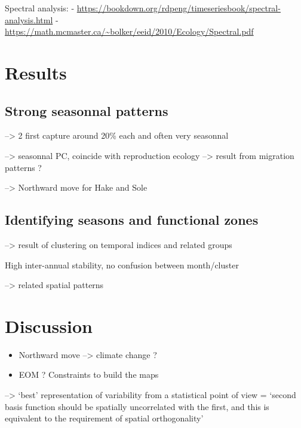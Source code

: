 \documentclass[
  man]{apa6}
\begin{document}
Spectral analysis: - \url{https://bookdown.org/rdpeng/timeseriesbook/spectral-analysis.html} - \url{https://math.mcmaster.ca/~bolker/eeid/2010/Ecology/Spectral.pdf}

\hypertarget{results}{%
\section{Results}\label{results}}

\hypertarget{strong-seasonnal-patterns}{%
\subsection{Strong seasonnal patterns}\label{strong-seasonnal-patterns}}

--\textgreater{} 2 first capture around 20\% each and often very seasonnal

--\textgreater{} seasonnal PC, coincide with reproduction ecology --\textgreater{} result from migration patterns ?

--\textgreater{} Northward move for Hake and Sole

\hypertarget{identifying-seasons-and-functional-zones}{%
\subsection{Identifying seasons and functional zones}\label{identifying-seasons-and-functional-zones}}

--\textgreater{} result of clustering on temporal indices and related groups

High inter-annual stability, no confusion between month/cluster

--\textgreater{} related spatial patterns

\hypertarget{discussion}{%
\section{Discussion}\label{discussion}}

\begin{itemize}
\item
  Northward move --\textgreater{} climate change ?
\item
  EOM ? Constraints to build the maps
\end{itemize}

--\textgreater{} `best' representation of variability from a statistical point of view = `second basis function should be spatially uncorrelated with the first, and this is equivalent to the requirement of spatial orthogonality'
\end{document}
